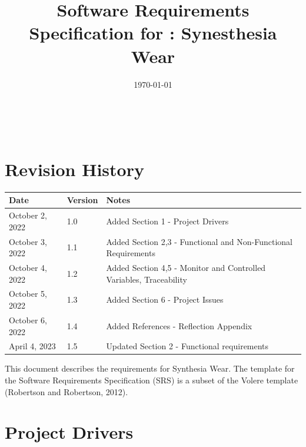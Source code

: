 \documentclass[12pt]{article}
\begin{document}
\title{Software Requirements Specification for \progname: Synesthesia Wear} 
\author{\authname}
\date{\today}
	
\maketitle

~\newpage


\tableofcontents

\pagebreak

\section*{Revision History}

\begin{tabularx}{\textwidth}{p{3cm}p{2cm}X}
\toprule {\bf Date} & {\bf Version} & {\bf Notes}\\
\midrule
October 2, 2022 & 1.0 & Added Section 1 - Project Drivers\\

October 3, 2022 & 1.1 & Added Section 2,3 - Functional and Non-Functional Requirements\\

October 4, 2022 & 1.2 & Added Section 4,5 - Monitor and Controlled Variables, Traceability  \\
October 5, 2022 & 1.3 & Added Section 6 -  Project Issues \\
October 6, 2022 & 1.4 & Added References -  Reflection Appendix \\
April 4, 2023 & 1.5 & Updated Section 2 - Functional requirements\\
\bottomrule
\end{tabularx}

\vspace{5mm}
\noindent
This document describes the requirements for Synthesia Wear.
The template for the Software Requirements Specification (SRS)
is a subset of the Volere template (Robertson and Robertson, 2012).

\section{Project Drivers}
\end{document}
